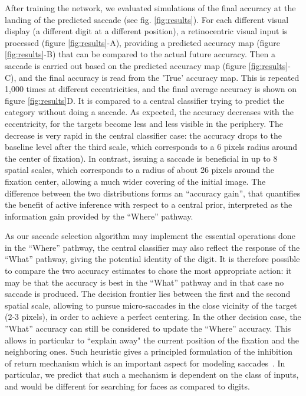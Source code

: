 After training the network, we evaluated simulations of the final accuracy at the landing of the predicted saccade (see fig. \ref{fig:results}). For each different visual display (a different digit at a different position), a retinocentric visual input is processed (figure \ref{fig:results}-A), providing a predicted accuracy map (figure \ref{fig:results}-B) that can be compared to the actual future accuracy. Then a saccade is carried out based on the predicted accuracy map (figure \ref{fig:results}-C), and the final accuracy is read from the 'True' accuracy map. This is repeated 1,000 times at different eccentricities, and the final average accuracy is shown on figure \ref{fig:results}D. It is compared to a central classifier trying to predict the category without doing a saccade.  
As expected, the  accuracy decreases with the eccentricity, for the targets become less and less visible in the periphery. 
The decrease is very rapid in the central classifier case: the accuracy drops to the baseline level after the third scale, which corresponds to a 6 pixels radius around the center of fixation). In contrast, issuing a saccade is beneficial in up to 8 spatial scales, which corresponds to a radius of about 26 pixels around the fixation center, allowing a much wider covering of the initial image. The difference between the two distributions forms an ``accuracy gain'', that quantifies the benefit of active inference with respect to a central prior, interpreted as the information gain provided by the ``Where'' pathway.


As our saccade selection algorithm may implement the essential operations done in the ``Where'' pathway, the central classifier may also reflect the response of the ``What'' pathway,  
giving the potential identity of the digit. %
It is therefore possible to compare the two accuracy estimates to chose the most appropriate action: it may be that the  accuracy is best in the ``What'' pathway and in that case no saccade is produced. 
The decision frontier lies between the first and the second spatial scale, allowing to pursue micro-saccades in the close vicinity of the target (2-3 pixels), in order to achieve a perfect centering.
In the other decision case, the ''What'' accuracy can still be considered to update the ``Where'' accuracy. 
This allows in particular to ``explain away" the current position of the fixation and the neighboring ones.
Such heuristic gives a principled formulation of the inhibition of return mechanism which is an important aspect for modeling saccades~\citep{Itti01}. In particular, we predict that such a mechanism is dependent on the class of inputs, and would be different for searching for faces as compared to digits.
